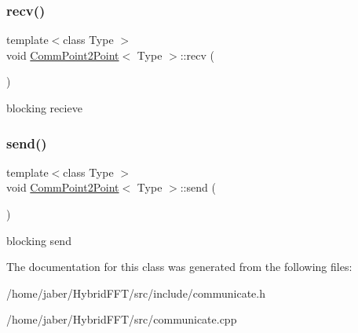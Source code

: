 \subsubsection{\texorpdfstring{recv()}{recv()}}
{\footnotesize\ttfamily template$<$class Type $>$ \\
void \mbox{\hyperlink{classCommPoint2Point}{Comm\+Point2\+Point}}$<$ Type $>$\+::recv (\begin{DoxyParamCaption}{ }\end{DoxyParamCaption})}

blocking recieve \mbox{\label{classCommPoint2Point_a974ce073715ec520a0c56f003cb8a1b0}} 
\subsubsection{\texorpdfstring{send()}{send()}}
{\footnotesize\ttfamily template$<$class Type $>$ \\
void \mbox{\hyperlink{classCommPoint2Point}{Comm\+Point2\+Point}}$<$ Type $>$\+::send (\begin{DoxyParamCaption}{ }\end{DoxyParamCaption})}

blocking send 

The documentation for this class was generated from the following files\+:\begin{DoxyCompactItemize}
\item 
/home/jaber/\+Hybrid\+F\+F\+T/src/include/communicate.\+h\item 
/home/jaber/\+Hybrid\+F\+F\+T/src/communicate.\+cpp\end{DoxyCompactItemize}
